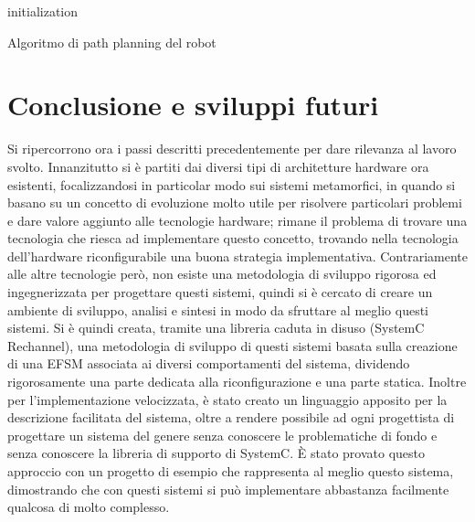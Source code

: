 \documentclass[a4paper,titlepage]{book}
\begin{document}
\begin{algorithm}[H]
 initialization\;
\caption{Algoritmo di path planning del robot}
\end{algorithm}


\chapter{Conclusione e sviluppi futuri}

Si ripercorrono ora i passi descritti precedentemente per dare rilevanza al lavoro svolto.
Innanzitutto si è partiti dai diversi tipi di architetture hardware ora esistenti, focalizzandosi in particolar modo sui sistemi metamorfici, in quando si basano su un concetto di evoluzione molto utile per risolvere particolari problemi e dare valore aggiunto alle tecnologie hardware; rimane il problema di trovare una tecnologia che riesca ad implementare questo concetto, trovando nella tecnologia dell'hardware riconfigurabile una buona strategia implementativa. Contrariamente alle altre tecnologie però, non esiste una metodologia di sviluppo rigorosa ed ingegnerizzata per progettare questi sistemi, quindi si è cercato di creare un ambiente di sviluppo, analisi e sintesi in modo da sfruttare al meglio questi sistemi. Si è quindi creata, tramite una libreria caduta in disuso (SystemC Rechannel), una metodologia di sviluppo di questi sistemi basata sulla creazione di una EFSM associata ai diversi comportamenti del sistema, dividendo rigorosamente una parte dedicata alla riconfigurazione e una parte statica. Inoltre per l'implementazione velocizzata, è stato creato un linguaggio apposito per la descrizione facilitata del sistema, oltre a rendere possibile ad ogni progettista di progettare un sistema del genere senza conoscere le problematiche di fondo e senza conoscere la libreria di supporto di SystemC. È stato provato questo approccio con un progetto di esempio che rappresenta al meglio questo sistema, dimostrando che con questi sistemi si può implementare abbastanza facilmente qualcosa di molto complesso.
\end{document}
